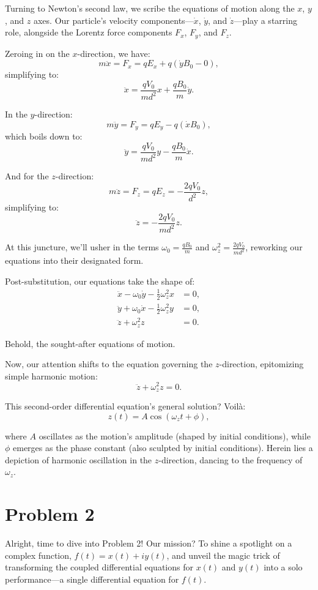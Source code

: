 \documentclass{article}
\begin{document}
Turning to Newton's second law, we scribe the equations of motion along the \(x\), \(y\), and \(z\) axes. Our particle's velocity components—\(\dot{x}\), \(\dot{y}\), and \(\dot{z}\)—play a starring role, alongside the Lorentz force components \(F_x\), \(F_y\), and \(F_z\).

Zeroing in on the \(x\)-direction, we have:
\[
m\ddot{x} = F_x = qE_x + q(\dot{y}B_0 - 0),
\]
simplifying to:
\[
\ddot{x} = \frac{qV_0}{md^2}x + \frac{qB_0}{m}\dot{y}.
\]

In the \(y\)-direction:
\[
m\ddot{y} = F_y = qE_y - q(\dot{x}B_0),
\]
which boils down to:
\[
\ddot{y} = \frac{qV_0}{md^2}y - \frac{qB_0}{m}\dot{x}.
\]

And for the \(z\)-direction:
\[
m\ddot{z} = F_z = qE_z = -\frac{2qV_0}{d^2}z,
\]
simplifying to:
\[
\ddot{z} = -\frac{2qV_0}{md^2}z.
\]

At this juncture, we'll usher in the terms \(\omega_0 = \frac{qB_0}{m}\) and \(\omega_z^2 = \frac{2qV_0}{md^2}\), reworking our equations into their designated form.

Post-substitution, our equations take the shape of:
\begin{align*}
\ddot{x} - \omega_0 \dot{y} - \frac{1}{2}\omega_z^2 x &= 0,\\
\ddot{y} + \omega_0 \dot{x} - \frac{1}{2}\omega_z^2 y &= 0,\\
\ddot{z} + \omega_z^2 z &= 0.
\end{align*}

Behold, the sought-after equations of motion.

Now, our attention shifts to the equation governing the \(z\)-direction, epitomizing simple harmonic motion:
\[
\ddot{z} + \omega_z^2 z = 0.
\]

This second-order differential equation's general solution? Voilà:
\[
z(t) = A \cos(\omega_z t + \phi),
\]

where \(A\) oscillates as the motion's amplitude (shaped by initial conditions), while \(\phi\) emerges as the phase constant (also sculpted by initial conditions). Herein lies a depiction of harmonic oscillation in the \(z\)-direction, dancing to the frequency of \(\omega_z\).

\section{Problem 2}

Alright, time to dive into Problem 2! Our mission? To shine a spotlight on a complex function, \(f(t) = x(t) + iy(t)\), and unveil the magic trick of transforming the coupled differential equations for \(x(t)\) and \(y(t)\) into a solo performance—a single differential equation for \(f(t)\).
\end{document}
